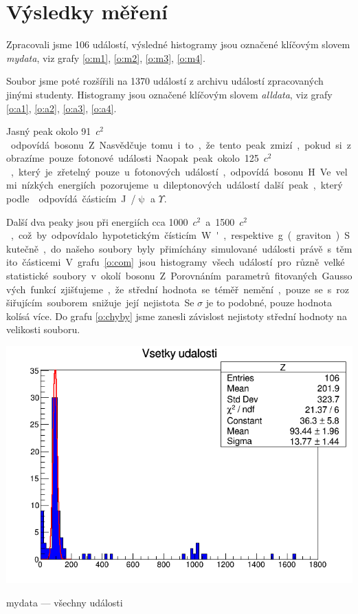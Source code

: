 \section*{Výsledky měření}
Zpracovali jsme 106 událostí, výsledné histogramy jsou označené klíčovým slovem \emph{mydata}, viz grafy \ref{o:m1}, \ref{o:m2}, \ref{o:m3}, \ref{o:m4}.

Soubor jsme poté rozšířili na 1370 událostí z archivu událostí zpracovaných jinými studenty. Histogramy jsou označené klíčovým slovem \emph{alldata}, viz grafy \ref{o:a1}, \ref{o:a2}, \ref{o:a3}, \ref{o:a4}.

Jasný peak okolo \SI{91}{\GeV\per $c^2$} odpovídá bosonu Z. Nasvědčuje tomu i to, že tento peak zmizí, pokud si zobrazíme pouze fotonové události.

Naopak peak okolo \SI{125}{\GeV\per $c^2$}, který je zřetelný pouze u fotonových událostí, odpovídá bosonu H.

Ve velmi nízkých energiích pozorujeme u dileptonových událostí další peak, který podle \cite{skripta} odpovídá částicím J/$\uppsi$ a $\Upsilon$.

Další dva peaky jsou při energiích cca \SI{1000}{\GeV\per $c^2$} a \SI{1500}{\GeV\per $c^2$}, což by odpovídalo hypotetickým čísticím W', respektive g (graviton). Skutečně, do našeho soubory byly přimíchány simulované události právě s těmito částicemi.


V grafu \ref{o:com} jsou histogramy všech událostí pro různě velké statistické soubory v okolí bosonu Z.
Porovnáním parametrů fitovaných Gaussových funkcí zjišťujeme, že střední hodnota se téměř nemění, pouze se s rozšiřujícím souborem snižuje její nejistota. Se $\sigma$ je to podobné, pouze hodnota kolísá více. Do grafu \ref{o:chyby} jsme zanesli závislost nejistoty střední hodnoty na velikosti souboru.





\begin{graph}[htbp]
\centering
\includegraphics[width=\textwidth-2cm]{graficos/mydataz/c1_n9.png}
\caption{mydata --- všechny události}
\label{o:m1}
\end{graph}

